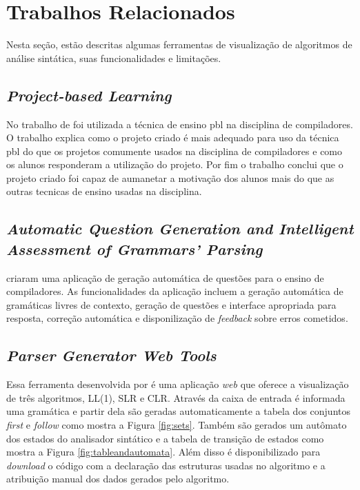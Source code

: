 \chapter{Trabalhos Relacionados}
\label{cap:trabalhos-relacionados}

Nesta seção, estão descritas algumas ferramentas de visualização de algoritmos de análise sintática, suas funcionalidades e limitações.

\section{\textit{Project-based Learning}}

No trabalho de \textcite{larapbl} foi utilizada a técnica de ensino \gls{pbl} na disciplina de compiladores. O trabalho explica como o projeto criado é mais adequado para uso da técnica \gls{pbl} do que os projetos comumente usados na disciplina de compiladores e como os alunos responderam a utilização do projeto. Por fim o trabalho conclui que o projeto criado foi capaz de aumanetar a motivação dos alunos mais do que as outras tecnicas de ensino usadas na disciplina.

\section{\textit{Automatic Question Generation
and Intelligent Assessment of Grammars' Parsing}}
\textcite{munozquestions} criaram uma aplicação de geração automática de questões para o ensino de compiladores. As funcionalidades da aplicação incluem a geração automática de gramáticas livres de contexto, geração de questões e interface apropriada para resposta, correção automática e disponilização de \textit{feedback} sobre erros cometidos.

\section{\textit{Parser Generator Web Tools}}
\label{sec:trabalho-relacionado-a}

Essa ferramenta desenvolvida por \textcite{Parser-2024-04-12} é uma aplicação \textit{web} que oferece a visualização de três algoritmos, LL(1), SLR e CLR. Através da caixa de entrada é informada uma gramática e partir dela são geradas automaticamente a tabela dos conjuntos \textit{first} e \textit{follow} como mostra a Figura \ref{fig:sets}. Também são gerados um autômato dos estados do analisador sintático e a tabela de transição de estados como mostra a Figura \ref{fig:tableandautomata}. Além disso é disponibilizado para \textit{download} o código com a declaração das estruturas usadas no algoritmo e a atribuição manual dos dados gerados pelo algoritmo.

